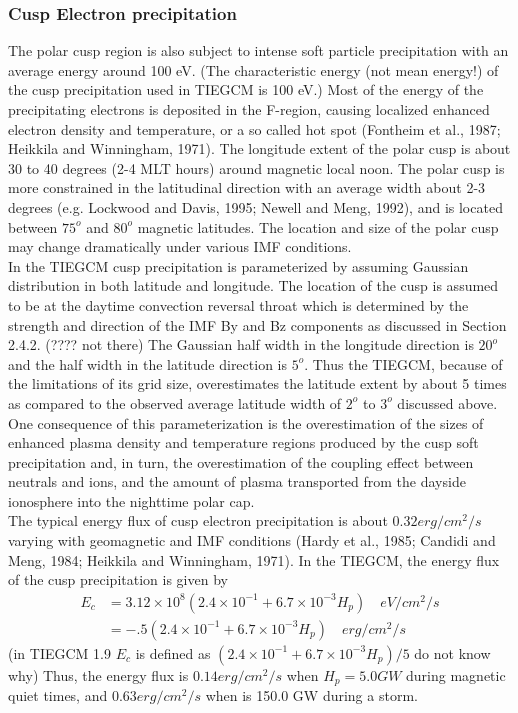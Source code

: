 \begin{enumerate}
\begin{enumerate}
\subsubsection{Cusp Electron precipitation}\label{cap:aurora_cuspelecprecip}
%
The polar cusp region is also subject to intense soft particle 
precipitation with an average energy around 100 eV. (The characteristic 
energy (not mean energy!) of the cusp precipitation used in TIEGCM is 
100 eV.) Most of the energy of the precipitating electrons is deposited 
in the F-region, causing localized enhanced electron density and temperature, 
or a so called hot spot (Fontheim et al., 1987; Heikkila and Winningham, 1971). 
The longitude extent of the polar cusp is about 30 to 40 degrees (2-4 MLT hours) 
around magnetic local noon. The polar cusp is more constrained in the latitudinal 
direction with an average width about 2-3 degrees (e.g. Lockwood and Davis, 1995; 
Newell and Meng, 1992), and is located between $75^o$ and $80^o$ magnetic latitudes. 
The location and size of the polar cusp may change dramatically under various 
IMF conditions. \\
%
In the TIEGCM cusp precipitation is parameterized by assuming Gaussian 
distribution in both latitude and longitude. The location of the cusp is 
assumed to be at the daytime convection reversal throat which is determined 
by the strength and direction of the IMF By and Bz components as discussed 
in Section 2.4.2. (???? not there) The Gaussian half width in the longitude direction is $20^o$ 
and the half width in the latitude direction is $5^o$. Thus the TIEGCM, because 
of the limitations of its grid size, overestimates the latitude extent by 
about 5 times as compared to the observed average latitude width of $2^o$ to 
$3^o$ discussed above. One consequence of this parameterization is the 
overestimation of the sizes of enhanced plasma density and temperature 
regions produced by the cusp soft precipitation and, in turn, the 
overestimation of the coupling effect between neutrals and ions, and the 
amount of plasma transported from the dayside ionosphere into the nighttime 
polar cap. \\
%
The typical energy flux of cusp electron precipitation is about 
$0.32 erg/cm^2/s$ varying with geomagnetic and IMF conditions 
(Hardy et al., 1985; Candidi and Meng, 1984; Heikkila and Winningham, 1971). 
In the TIEGCM, the energy flux of the cusp precipitation is given by
%
\begin{equation}
  \begin{split}
      E_c & = 3.12 \times 10^8 (2.4 \times 10^{-1} + 6.7 \times 10^{-3}H_p) \quad  eV/cm^2/s \\
          & = -.5(2.4\times10^{-1} + 6.7\times 10^{-3} H_p) \quad  erg/cm^2/s
  \end{split}
    \label{eq:aurora_12}
\end{equation}
%   
(in TIEGCM 1.9 $E_c$ is defined as 
$(2.4 \times 10^{-1} + 6.7 \times 10^{-3}H_p)/5$ do not know why) 
Thus, the energy flux is $0.14 erg/cm^2/s$ when $H_p = 5.0 GW$ during  magnetic 
quiet times, and $0.63 erg/cm^2/s$ when  is 150.0 GW during a storm.
%

\end{enumerate}
\end{enumerate}
